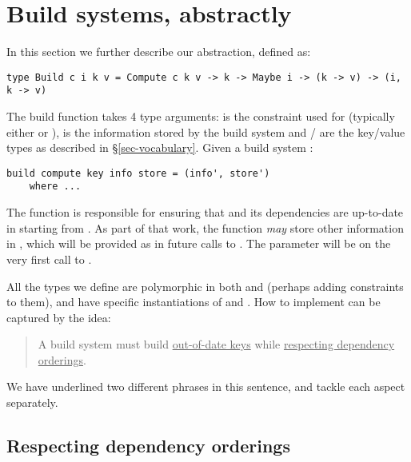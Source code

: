 \section{Build systems, abstractly}\label{sec-build}

In this section we further describe our  abstraction, defined as:

\begin{verbatim}
type Build c i k v = Compute c k v -> k -> Maybe i -> (k -> v) -> (i, k -> v)
\end{verbatim}

The build function takes 4 type arguments:  is the constraint used for  (typically either  or ),  is the information stored by the build system and / are the key/value types as described in \S\ref{sec-vocabulary}. Given a build system :

\begin{verbatim}
build compute key info store = (info', store')
    where ...
\end{verbatim}

The function  is responsible for ensuring that  and its dependencies are up-to-date in  starting from . As part of that work, the  function \textit{may} store other information in , which will be provided as  in future calls to . The  parameter will be  on the very first call to .

All the  types we define are polymorphic in both  and  (perhaps adding constraints to them), and have specific instantiations of  and . How to implement  can be captured by the idea:

\begin{quote}
A build system must build \underline{out-of-date keys} while \underline{respecting dependency orderings}.
\end{quote}



We have underlined two different phrases in this sentence, and tackle each aspect separately.


\subsection{Respecting dependency orderings}

